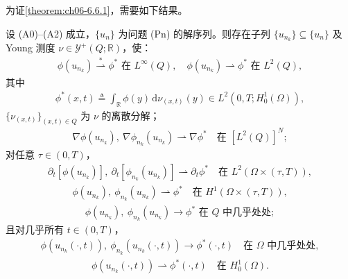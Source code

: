 \documentclass[../../main.tex]{subfiles}%
\begin{document}
为证\cref{theorem:ch06-6.6.1}，需要如下结果。

\begin{proposition}\label{proposition:ch06-6.6.2}
设 (A0)--(A2) 成立，$\{u_n\}$ 为问题 (Pn) 的解序列。则存在子列 $\{u_{n_k}\}\subseteq\{u_n\}$ 及 Young 测度 $\nu\in\mathcal{Y}^+(Q;\mathbb{R})$，使：
\begin{align}
\phi(u_{n_k})\stackrel{*}{\rightharpoonup}\phi^* \text{ 在 }L^\infty(Q),\quad
\phi(u_{n_k})\rightharpoonup\phi^* \text{ 在 }L^2(Q), \label{align:ch6-6.82}
\end{align}
其中
\begin{align}
\phi^*(x,t)\triangleq \int_\mathbb{R}\phi(y)\,\mathrm{d}\nu_{(x,t)}(y)\in L^2(0,T;H^1_0(\Omega)), \label{align:ch6-6.83}
\end{align}
$\{\nu_{(x,t)}\}_{(x,t)\in Q}$ 为 $\nu$ 的离散分解；
\begin{align}
\nabla\phi(u_{n_k}),\ \nabla\phi_{n_k}(u_{n_k})\rightharpoonup\nabla\phi^* \quad\text{在 }[L^2(Q)]^N; \label{align:ch6-6.84}
\end{align}
对任意 $\tau\in(0,T)$，
\begin{align}
\partial_t[\phi(u_{n_k})],\ \partial_t[\phi_{n_k}(u_{n_k})]\rightharpoonup\partial_t\phi^*
\quad\text{在 }L^2(\Omega\times(\tau,T)), \label{align:ch6-6.85}
\end{align}
\begin{align}
\phi(u_{n_k}),\ \phi_{n_k}(u_{n_k})\rightharpoonup\phi^* \quad\text{在 }H^1(\Omega\times(\tau,T)), \label{align:ch6-6.86}
\end{align}
\begin{align}
\phi(u_{n_k}),\ \phi_{n_k}(u_{n_k})\to\phi^* \text{ 在 }Q\text{ 中几乎处处}; \label{align:ch6-6.87}
\end{align}
且对几乎所有 $t\in(0,T)$，
\begin{align}
\phi(u_{n_k}(\cdot,t)),\ \phi_{n_k}(u_{n_k}(\cdot,t))\to\phi^*(\cdot,t)
\quad\text{在 }\Omega\text{ 中几乎处处}, \label{align:ch6-6.88}
\end{align}
\begin{align}
\phi(u_{n_k}(\cdot,t))\rightharpoonup\phi^*(\cdot,t) \quad\text{在 }H^1_0(\Omega). \label{align:ch6-6.89}
\end{align}
\end{proposition}
\end{document}
